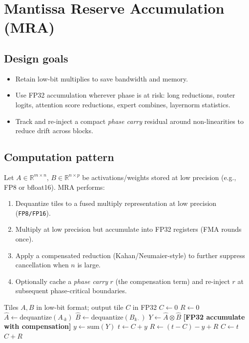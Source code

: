 \documentclass[11pt]{article}
\newcommand{\R}{\mathbb{R}}
\theoremstyle{plain}
\theoremstyle{definition}
\begin{document}
\section{Mantissa Reserve Accumulation (MRA)}
\label{sec:mra}

\subsection{Design goals}
\begin{itemize}
  \item Retain low-bit multiplies to save bandwidth and memory.
  \item Use FP32 accumulation wherever phase is at risk: long reductions, router logits, attention score reductions, expert combines, layernorm statistics.
  \item Track and re-inject a compact \emph{phase carry} residual around non-linearities to reduce drift across blocks.
\end{itemize}

\subsection{Computation pattern}

Let $A\in\R^{m\times n}$, $B\in\R^{n\times p}$ be activations/weights stored at low precision (e.g., FP8 or bfloat16). MRA performs:
\begin{enumerate}
  \item Dequantize tiles to a fused multiply representation at low precision (\texttt{FP8/FP16}).
  \item Multiply at low precision but accumulate into FP32 registers (FMA rounds once).
  \item Apply a compensated reduction (Kahan/Neumaier-style) to further suppress cancellation when $n$ is large.
  \item Optionally cache a \emph{phase carry} $r$ (the compensation term) and re-inject $r$ at subsequent phase-critical boundaries.
\end{enumerate}

\begin{algorithm}[t]
\caption{MRA: GEMM micro-kernel (schematic)}
\label{alg:mra}
\begin{algorithmic}[1]
\Require Tiles $A,B$ in low-bit format; output tile $C$ in FP32
\State $C \gets 0$ 
\State $R \gets 0$ 
  \State $\hat A \gets \mathrm{dequantize}(A_{\cdot k})$ 
  \State $\hat B \gets \mathrm{dequantize}(B_{k \cdot})$
  \State $Y \gets \hat A \otimes \hat B$ 
  \State \textbf{[FP32 accumulate with compensation]}
  \State $y \gets \mathrm{sum}(Y)$ 
  \State $t \gets C + y$
  \State $R \gets (t - C) - y + R$
  \State $C \gets t$
\EndFor
\State \Return $C + R$ 
\end{algorithmic}
\end{algorithm}
\end{document}
